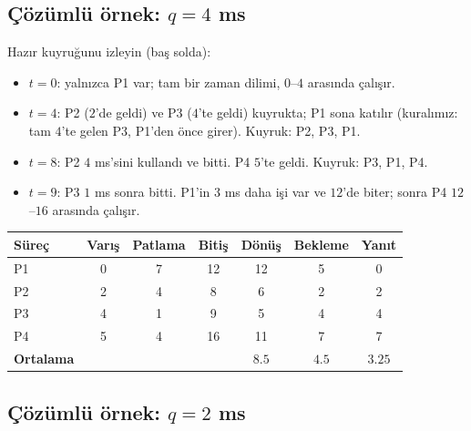 \subsection{Çözümlü örnek: $q = 4$ ms}

\begin{center}
\end{center}

Hazır kuyruğunu izleyin (baş solda):
\begin{itemize}
  \item $t=0$: yalnızca P1 var; tam bir zaman dilimi, $0$--$4$ arasında çalışır.
  \item $t=4$: P2 ($2$'de geldi) ve P3 ($4$'te geldi) kuyrukta; P1 sona katılır (kuralımız: tam $4$'te gelen P3, P1'den önce girer). Kuyruk: P2, P3, P1.
  \item $t=8$: P2 $4$ ms'sini kullandı ve bitti. P4 $5$'te geldi. Kuyruk: P3, P1, P4.
  \item $t=9$: P3 $1$ ms sonra bitti. P1'in $3$ ms daha işi var ve $12$'de biter; sonra P4 $12$--$16$ arasında çalışır.
\end{itemize}

\begin{center}
\renewcommand{\arraystretch}{1.2}
\begin{tabular}{@{}lcccccc@{}}
\toprule
\textbf{Süreç} & \textbf{Varış} & \textbf{Patlama} & \textbf{Bitiş} & \textbf{Dönüş} & \textbf{Bekleme} & \textbf{Yanıt}\\
\midrule
P1 & 0 & 7 & 12 & 12 & 5 & 0\\
P2 & 2 & 4 & 8 & 6 & 2 & 2\\
P3 & 4 & 1 & 9 & 5 & 4 & 4\\
P4 & 5 & 4 & 16 & 11 & 7 & 7\\
\midrule
\textbf{Ortalama} & & & & $8.5$ & $4.5$ & $3.25$\\
\bottomrule
\end{tabular}
\end{center}

\subsection{Çözümlü örnek: $q = 2$ ms}

\begin{center}
\end{center}

